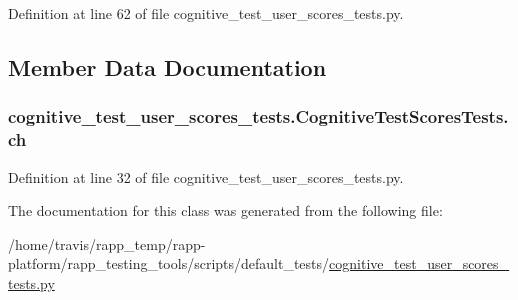 Definition at line 62 of file cognitive\-\_\-test\-\_\-user\-\_\-scores\-\_\-tests.\-py.



\subsection{Member Data Documentation}
\hypertarget{classcognitive__test__user__scores__tests_1_1CognitiveTestScoresTests_acd1f15d76fb3ef4f485144013e8269da}{
\subsubsection[{ch}]{\setlength{\rightskip}{0pt plus 5cm}cognitive\-\_\-test\-\_\-user\-\_\-scores\-\_\-tests.\-Cognitive\-Test\-Scores\-Tests.\-ch}}\label{classcognitive__test__user__scores__tests_1_1CognitiveTestScoresTests_acd1f15d76fb3ef4f485144013e8269da}


Definition at line 32 of file cognitive\-\_\-test\-\_\-user\-\_\-scores\-\_\-tests.\-py.



The documentation for this class was generated from the following file\-:\begin{DoxyCompactItemize}
\item 
/home/travis/rapp\-\_\-temp/rapp-\/platform/rapp\-\_\-testing\-\_\-tools/scripts/default\-\_\-tests/\hyperlink{cognitive__test__user__scores__tests_8py}{cognitive\-\_\-test\-\_\-user\-\_\-scores\-\_\-tests.\-py}\end{DoxyCompactItemize}
